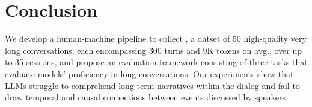 \section{Conclusion}
 We develop a human-machine pipeline to collect \dataset{}, a datset of 50 high-quality very long conversations, each encompassing 300 turns and 9K tokens on avg., over up to 35 sessions, and propose an evaluation framework consisting of three tasks that evaluate models' proficiency in long conversations. Our experiments show that LLMs struggle to comprehend long-term narratives within the dialog and fail to draw temporal and causal connections between events discussed by speakers.